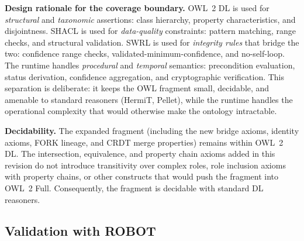 \textbf{Design rationale for the coverage boundary.}
OWL~2 DL is used for \emph{structural} and \emph{taxonomic} assertions: class hierarchy, property characteristics, and disjointness. SHACL is used for \emph{data-quality} constraints: pattern matching, range checks, and structural validation. SWRL is used for \emph{integrity rules} that bridge the two: confidence range checks, validated-minimum-confidence, and no-self-loop. The runtime handles \emph{procedural} and \emph{temporal} semantics: precondition evaluation, status derivation, confidence aggregation, and cryptographic verification. This separation is deliberate: it keeps the OWL fragment small, decidable, and amenable to standard reasoners (HermiT, Pellet), while the runtime handles the operational complexity that would otherwise make the ontology intractable.

\textbf{Decidability.}
The expanded fragment (including the new bridge axioms, identity axioms, FORK lineage, and CRDT merge properties) remains within OWL~2 DL. The intersection, equivalence, and property chain axioms added in this revision do not introduce transitivity over complex roles, role inclusion axioms with property chains, or other constructs that would push the fragment into OWL~2 Full. Consequently, the fragment is decidable with standard DL reasoners.

\subsection{Validation with ROBOT}\label{subsec:validation-robot}

